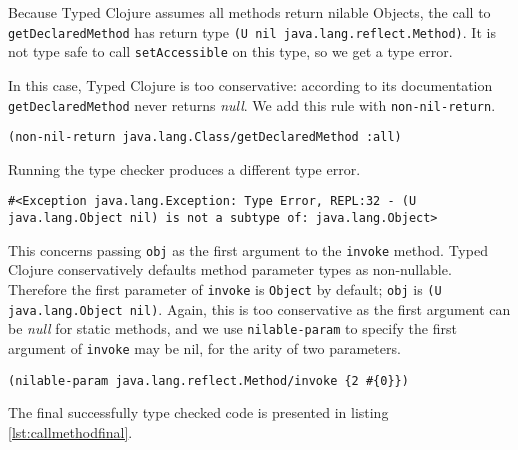 Because Typed Clojure assumes all methods return nilable Objects, the call to \lstinline|getDeclaredMethod|
has return type \lstinline|(U nil java.lang.reflect.Method)|. It is not type safe to call \lstinline|setAccessible|
on this type, so we get a type error.

In this case, Typed Clojure is too conservative: according to its documentation \lstinline|getDeclaredMethod|
never returns \emph{null}. We add this rule with \lstinline|non-nil-return|.

\begin{lstlisting}
(non-nil-return java.lang.Class/getDeclaredMethod :all)
\end{lstlisting}

Running the type checker produces a different type error.

\begin{lstlisting}
#<Exception java.lang.Exception: Type Error, REPL:32 - (U java.lang.Object nil) is not a subtype of: java.lang.Object>
\end{lstlisting}

This concerns passing \lstinline|obj| as the first argument to the \lstinline|invoke| method.
Typed Clojure conservatively defaults method parameter types as non-nullable. 
Therefore the first parameter of \lstinline|invoke| is \lstinline|Object| by default; \lstinline|obj|
is \lstinline|(U java.lang.Object nil)|. Again, this is too conservative as the first argument can
be \emph{null} for static methods, and we use \lstinline|nilable-param| to specify the first argument
of \lstinline|invoke| may be nil, for the arity of two parameters.

\begin{lstlisting}
(nilable-param java.lang.reflect.Method/invoke {2 #{0}})
\end{lstlisting}

The final successfully type checked code is presented in listing \ref{lst:callmethodfinal}.


